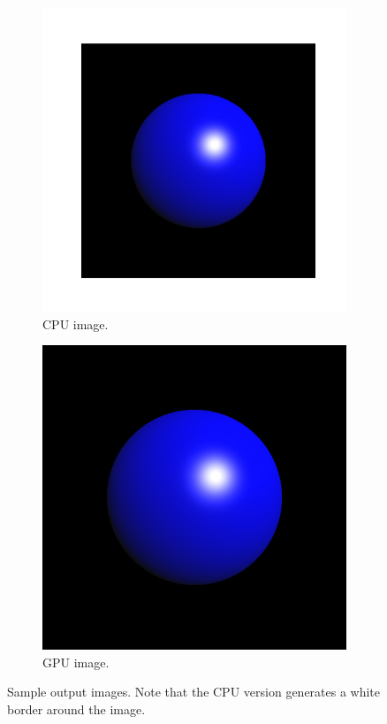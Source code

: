\documentclass{article}
\begin{document}
\begin{figure}
    \begin{subfigure}{0.5\linewidth}
        \includegraphics[width=\linewidth]{../raytracing_py.png}
        \caption{CPU image.}
    \end{subfigure}
    \begin{subfigure}{0.5\linewidth}
        \includegraphics[width=\linewidth]{output.png}
        \caption{GPU image.}
    \end{subfigure}
    \caption{Sample output images. Note that the CPU version generates a white
    border around the image.}
    \label{fig:output}
\end{figure}
\end{document}
